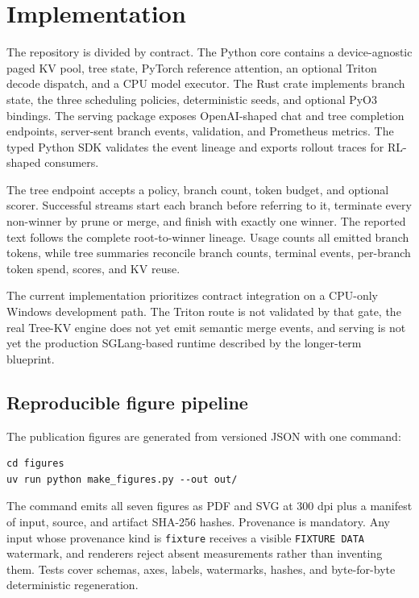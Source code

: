 \section{Implementation}

The repository is divided by contract.  The Python core contains a
device-agnostic paged KV pool, tree state, PyTorch reference attention, an
optional Triton decode dispatch, and a CPU model executor.  The Rust crate
implements branch state, the three scheduling policies, deterministic seeds,
and optional PyO3 bindings.  The serving package exposes OpenAI-shaped chat and
tree completion endpoints, server-sent branch events, validation, and
Prometheus metrics.  The typed Python SDK validates the event lineage and
exports rollout traces for RL-shaped consumers.

The tree endpoint accepts a policy, branch count, token budget, and optional
scorer.  Successful streams start each branch before referring to it, terminate
every non-winner by prune or merge, and finish with exactly one winner.  The
reported text follows the complete root-to-winner lineage.  Usage counts all
emitted branch tokens, while tree summaries reconcile branch counts, terminal
events, per-branch token spend, scores, and KV reuse.

The current implementation prioritizes contract integration on a CPU-only
Windows development path.  The Triton route is not validated by that gate, the
real Tree-KV engine does not yet emit semantic merge events, and serving is not
yet the production SGLang-based runtime described by the longer-term blueprint.

\subsection{Reproducible figure pipeline}

The publication figures are generated from versioned JSON with one command:
\begin{verbatim}
cd figures
uv run python make_figures.py --out out/
\end{verbatim}
The command emits all seven figures as PDF and SVG at 300 dpi plus a manifest of
input, source, and artifact SHA-256 hashes.  Provenance is mandatory.  Any input
whose provenance kind is \texttt{fixture} receives a visible
\texttt{FIXTURE DATA} watermark, and renderers reject absent measurements rather
than inventing them.  Tests cover schemas, axes, labels, watermarks, hashes, and
byte-for-byte deterministic regeneration.
